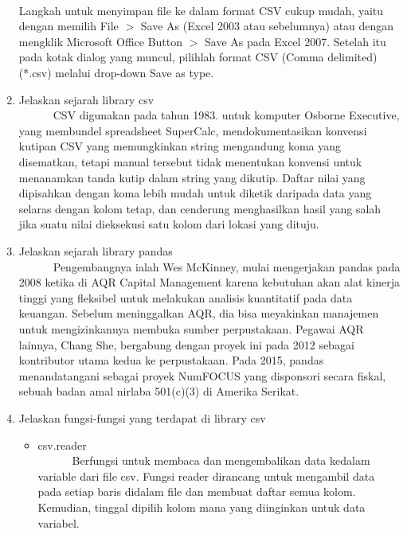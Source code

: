 \begin{enumerate}
\paragraph{}Langkah untuk menyimpan file ke dalam format CSV cukup mudah, yaitu dengan memilih File $>$ Save As (Excel 2003 atau sebelumnya) atau dengan mengklik Microsoft Office Button $>$ Save As pada Excel 2007. Setelah itu pada kotak dialog yang muncul, pilihlah format CSV (Comma delimited) (*.csv) melalui drop-down Save as type.
\item Jelaskan sejarah library csv\\
\verb|		|CSV digunakan pada tahun 1983. untuk komputer Osborne Executive, yang membundel spreadsheet SuperCalc, mendokumentasikan konvensi kutipan CSV yang memungkinkan string mengandung koma yang disematkan, tetapi manual tersebut tidak menentukan konvensi untuk menanamkan tanda kutip dalam string yang dikutip. Daftar nilai yang dipisahkan dengan koma lebih mudah untuk diketik daripada data yang selaras dengan kolom tetap, dan cenderung menghasilkan hasil yang salah jika suatu nilai dieksekusi satu kolom dari lokasi yang dituju.
	
\item Jelaskan sejarah library pandas\\
\verb|		|Pengembangnya ialah Wes McKinney, mulai mengerjakan pandas pada 2008 ketika di AQR Capital Management karena kebutuhan akan alat kinerja tinggi yang fleksibel untuk melakukan analisis kuantitatif pada data keuangan. Sebelum meninggalkan AQR, dia bisa meyakinkan manajemen untuk mengizinkannya membuka sumber perpustakaan. Pegawai AQR lainnya, Chang She, bergabung dengan proyek ini pada 2012 sebagai kontributor utama kedua ke perpustakaan. Pada 2015, pandas menandatangani sebagai proyek NumFOCUS yang disponsori secara fiskal, sebuah badan amal nirlaba 501(c)(3) di Amerika Serikat.
	
\item Jelaskan fungsi-fungsi yang terdapat di library csv\\
\begin{itemize}
\item csv.reader\\
	\verb|		|Berfungsi untuk membaca dan mengembalikan data kedalam variable dari file csv.	Fungsi 	reader dirancang untuk mengambil data pada setiap baris didalam file dan membuat daftar semua 	kolom. Kemudian, tinggal dipilih kolom mana yang diinginkan untuk data variabel.



\end{itemize}
\end{enumerate}
